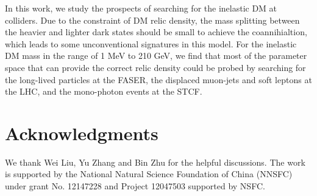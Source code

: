\documentclass[preprint, superscriptaddress,amsmath, nofootinbib]{revtex4-1}
\begin{document}
In this work, we study the prospects of searching for the inelastic DM at colliders. Due to the constraint of DM relic density, the mass splitting between the heavier and lighter dark states should be small to achieve the coannihialtion, which leads to some unconventional signatures in this model. For the inelastic DM mass in the range of 1 MeV to 210 GeV, we find that most of the parameter space that can provide the correct relic density could be probed by searching for the long-lived particles at the FASER, the displaced muon-jets and soft leptons at the LHC, and the mono-photon events at the STCF.

\section*{Acknowledgments} 

We thank Wei Liu, Yu Zhang and Bin Zhu for the helpful discussions. 
The work is supported by the National Natural Science Foundation of China (NNSFC) under grant No. 12147228 and Project 12047503 supported by NSFC.

\end{document}

